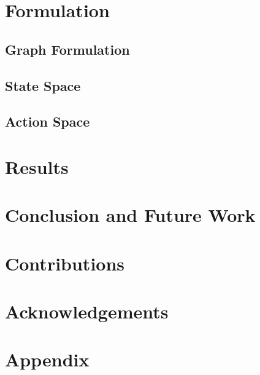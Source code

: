\documentclass[runningheads]{llncs}
\begin{document}
\section{Formulation}

\subsection{Graph Formulation}

\subsection{State Space}

\subsection{Action Space}

\section{Results}


\section{Conclusion and Future Work}

\section{Contributions}

\section{Acknowledgements}

\section{Appendix}





\end{document}
